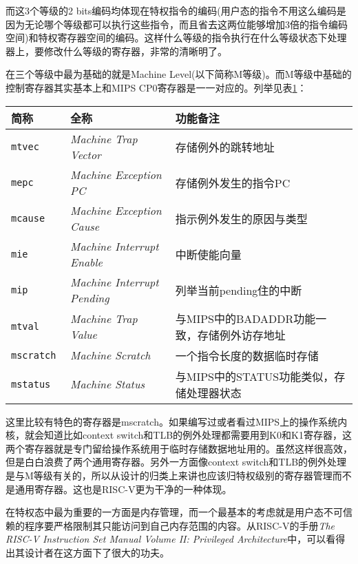 \begin{enumerate}
	而这3个等级的2 bits编码均体现在特权指令的编码(用户态的指令不用这么编码是因为无论哪个等级都可以执行这些指令，而且省去这两位能够增加3倍的指令编码空间)和特权寄存器空间的编码。这样什么等级的指令执行在什么等级状态下处理器上，要修改什么等级的寄存器，非常的清晰明了。
	
	在三个等级中最为基础的就是Machine Level(以下简称M等级)。而M等级中基础的控制寄存器其实基本上和MIPS CP0寄存器是一一对应的。列举见表\ref{tab:sampleofCSR}：
	\begin{table}[!htbp]
		\label{tab:sampleofCSR}
		\centering
		\footnotesize%
		\setlength{\tabcolsep}{4pt}%
		\renewcommand{\arraystretch}{1.2}%
		\begin{tabular}{lll}
			\hline
			简称 & 全称 & 功能备注 \\%
			\hline
			\tt mtvec    & \textit{Machine Trap Vector}       & 存储例外的跳转地址 \\
			\tt mepc     & \textit{Machine Exception PC}      & 存储例外发生的指令PC \\
			\tt mcause   & \textit{Machine Exception Cause}   & 指示例外发生的原因与类型 \\
			\tt mie      & \textit{Machine Interrupt Enable}  & 中断使能向量 \\
			\tt mip      & \textit{Machine Interrupt Pending} & 列举当前pending住的中断 \\
			\tt mtval    & \textit{Machine Trap Value} & 与MIPS中的BADADDR功能一致，存储例外访存地址 \\
			\tt mscratch & \textit{Machine Scratch}    & 一个指令长度的数据临时存储 \\
			\tt mstatus  & \textit{Machine Status}     & 与MIPS中的STATUS功能类似，存储处理器状态 \\
			\hline
		\end{tabular}
	\end{table}
	
	这里比较有特色的寄存器是mscratch。如果编写过或者看过MIPS上的操作系统内核，就会知道比如context switch和TLB的例外处理都需要用到K0和K1寄存器，这两个寄存器就是专门留给操作系统用于临时存储数据地址用的。虽然这样很高效，但是白白浪费了两个通用寄存器。另外一方面像context switch和TLB的例外处理是与M等级有关的，所以从设计的归类上来讲也应该归特权级别的寄存器管理而不是通用寄存器。这也是RISC-V更为干净的一种体现。
	
	在特权态中最为重要的一方面是内存管理，而一个最基本的考虑就是用户态不可信赖的程序要严格限制其只能访问到自己内存范围的内容。从RISC-V的手册\textit{The RISC-V Instruction Set Manual Volume II: Privileged Architecture}中，可以看得出其设计者在这方面下了很大的功夫。
	

\end{enumerate}
